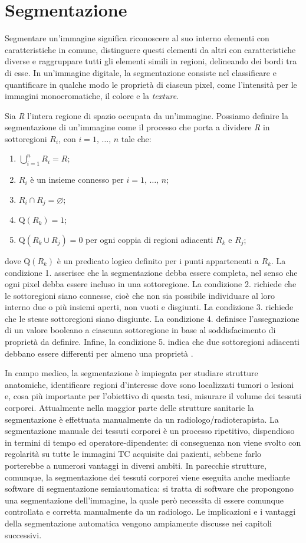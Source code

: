 \section{Segmentazione}
Segmentare un’immagine significa riconoscere al suo interno elementi con caratteristiche in comune, distinguere questi elementi da altri con caratteristiche diverse e raggruppare tutti gli elementi simili in regioni, delineando dei bordi tra di esse. In un’immagine digitale, la segmentazione consiste nel classificare e quantificare in qualche modo le proprietà di ciascun pixel, come l’intensità per le immagini monocromatiche, il colore e la \textit{texture}.

Sia \textit{R} l’intera regione di spazio occupata da un’immagine. Possiamo definire la segmentazione di un’immagine come il processo che porta a dividere \textit{R} in sottoregioni $R_i$, con $i = 1,\,\dots,\,n $ tale che:
\begin{enumerate}
\item $\bigcup\limits_{i=1}^n R_i = R$;
\item $R_i$ è un insieme connesso per $i = 1,\,\dots,\,n$;
\item $R_i \cap R_j = \varnothing$;
\item $ \text{Q}(R_k) = 1 $;
\item $ \text{Q}(R_k \cup R_j) = 0 $ per ogni coppia di regioni adiacenti $R_k$ e $R_j$;
\end{enumerate}
dove $\text{Q}(R_k)$ è un predicato logico definito per i punti appartenenti a $R_k$. La condizione 1. asserisce che la segmentazione debba essere completa, nel senso che ogni pixel debba essere incluso in una sottoregione. La condizione 2. richiede che le sottoregioni siano connesse, cioè che non sia possibile individuare al loro interno due o più insiemi aperti, non vuoti e disgiunti. La condizione 3. richiede che le stesse sottoregioni siano disgiunte. La condizione 4. definisce l’assegnazione di un valore booleano a ciascuna sottoregione in base al soddisfacimento di proprietà da definire. Infine, la condizione 5. indica che due sottoregioni adiacenti debbano essere differenti per almeno una proprietà \cite[700]{gonzalez}.

In campo medico, la segmentazione è impiegata per studiare strutture anatomiche, identificare regioni d’interesse dove sono localizzati tumori o lesioni e, cosa più importante per l’obiettivo di questa tesi, misurare il volume dei tessuti corporei. Attualmente nella maggior parte delle strutture sanitarie la segmentazione è effettuata manualmente da un radiologo/radioterapista. La segmentazione manuale dei tessuti corporei è un processo ripetitivo, dispendioso in termini di tempo ed operatore-dipendente: di conseguenza non viene svolto con regolarità su tutte le immagini TC acquisite dai pazienti, sebbene farlo porterebbe a numerosi vantaggi in diversi ambiti. In parecchie strutture, comunque, la segmentazione dei tessuti corporei viene eseguita anche mediante software di segmentazione semiautomatica: si tratta di software che propongono una segmentazione dell'immagine, la quale però necessita di essere comunque controllata e corretta manualmente da un radiologo. Le implicazioni e i vantaggi della segmentazione automatica vengono ampiamente discusse nei capitoli successivi.

